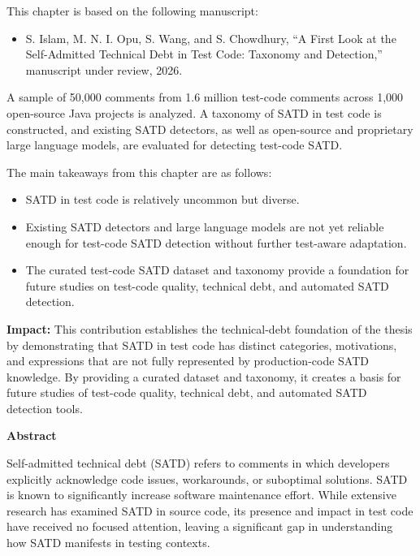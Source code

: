 This chapter is based on the following manuscript:
\begin{itemize}
\item S. Islam, M. N. I. Opu, S. Wang, and S. Chowdhury, ``A First Look at the Self-Admitted Technical Debt in Test Code: Taxonomy and Detection,'' manuscript under review, 2026.
\end{itemize}

A sample of 50,000 comments from 1.6 million test-code comments across 1,000 open-source Java projects is analyzed. A taxonomy of SATD in test code is constructed, and existing SATD detectors, as well as open-source and proprietary large language models, are evaluated for detecting test-code SATD.

The main takeaways from this chapter are as follows:
\begin{itemize}
\item SATD in test code is relatively uncommon but diverse.
\item Existing SATD detectors and large language models are not yet reliable enough for test-code SATD detection without further test-aware adaptation.
\item The curated test-code SATD dataset and taxonomy provide a foundation for future studies on test-code quality, technical debt, and automated SATD detection.
\end{itemize}

\textbf{Impact:} This contribution establishes the technical-debt foundation of the thesis by demonstrating that SATD in test code has distinct categories, motivations, and expressions that are not fully represented by production-code SATD knowledge. By providing a curated dataset and taxonomy, it creates a basis for future studies of test-code quality, technical debt, and automated SATD detection tools.


\clearpage

\begin{center}
{\Large\bfseries Abstract}
\end{center}
Self-admitted technical debt (SATD) refers to comments in which developers explicitly acknowledge code issues, workarounds, or suboptimal solutions. SATD is known to significantly increase software maintenance effort. While extensive research has examined SATD in source code, its presence and impact in test code have received no focused attention, leaving a significant gap in understanding how SATD manifests in testing contexts.

